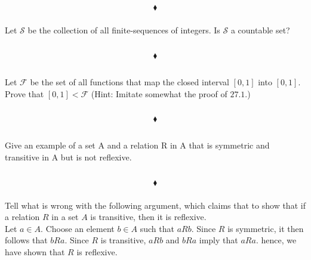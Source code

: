 $$\blacklozenge$$

\subsubsection{}
\begin{tcolorbox}
Let $\mathscr{S}$ be the collection of all finite-sequences of integers. Is $\mathscr{S}$ a countable set? 
\end{tcolorbox}
$$ $$

$$\blacklozenge$$


\renewcommand{\thesubsection}{\thesection.\RomanNumeralCaps{12}}
\subsection{}
\begin{tcolorbox}
Let $\mathscr{F}$ be the set of all functions that map the closed interval $[0, 1]$ into $[0, 1]$. Prove that $[0,1] < \mathscr{F}$ (Hint: Imitate somewhat the proof of $\mathbf{27.1}$.) 
\end{tcolorbox}
$$ $$

$$\blacklozenge$$

\renewcommand{\thesubsection}{\thesection.\RomanNumeralCaps{13}}
\subsection{}
\subsubsection{}
\begin{tcolorbox}
Give an example of a set A and a relation R in A that is symmetric and transitive in A but is not reflexive. 
\end{tcolorbox}
$$ $$

$$\blacklozenge$$

\subsubsection{}
\begin{tcolorbox}
Tell what is wrong with the following argument, which claims that to show that if a relation $R$ in a set $A$ is transitive, then it is reflexive.
\\
Let $a\in A$. Choose an element $b\in A$ such that $aRb$. Since $R$ is symmetric, it then follows that $bRa$. Since $R$ is transitive, $aRb$ and $bRa$ imply that $aRa$. hence, we have shown that $R$ is reflexive.
\end{tcolorbox}
$$ $$


